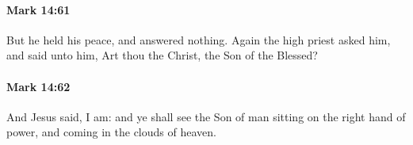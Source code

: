 		\paragraph{Mark 14:61} %
			\label{MARK-14-61}

			But he held his peace, and answered nothing. Again the high priest asked him, and said unto him, Art thou the Christ, the Son of the Blessed?

			\begin{framed}
			\scriptsize
				\begin{compactdesc}
					\item[SBLG] 
				\end{compactdesc}
			\end{framed}

		\paragraph{Mark 14:62} %
			\label{MARK-14-62}

			And Jesus said, I am: and ye shall see the Son of man sitting on the right hand of power, and coming in the clouds of heaven.

